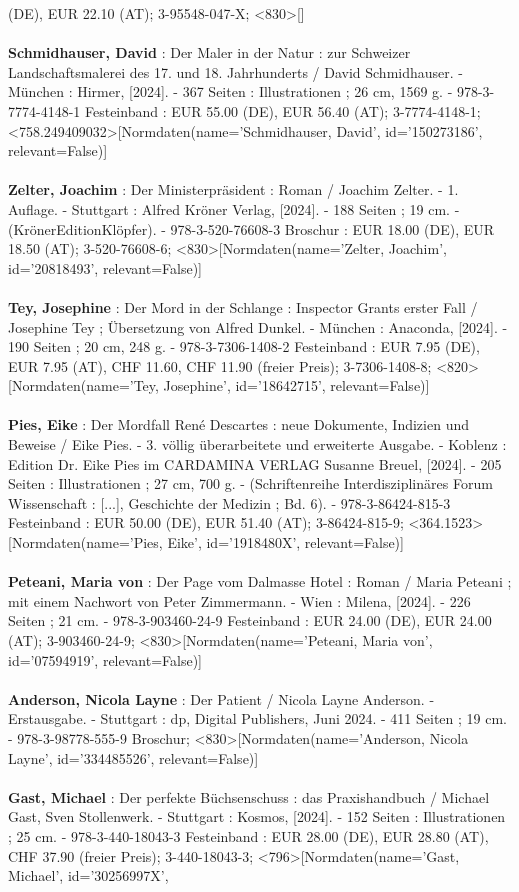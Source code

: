 \documentclass{article}
\begin{document}
\begin{multicols}{3}
(DE), EUR 22.10 (AT); 3-95548-047-X; <830>[]\\\\\textbf{Schmidhauser, David} : Der Maler in der Natur : zur Schweizer Landschaftsmalerei des 17. und 18. Jahrhunderts / David Schmidhauser. - München : Hirmer, [2024]. - 367 Seiten : Illustrationen ; 26 cm, 1569 g. - 978-3-7774-4148-1 Festeinband : EUR 55.00 (DE), EUR 56.40 (AT); 3-7774-4148-1; <758.249409032>[Normdaten(name='Schmidhauser, David', id='150273186', relevant=False)]\\\\\textbf{Zelter, Joachim} : Der Ministerpräsident : Roman / Joachim Zelter. - 1. Auflage. - Stuttgart : Alfred Kröner Verlag, [2024]. - 188 Seiten ; 19 cm. - (KrönerEditionKlöpfer). - 978-3-520-76608-3 Broschur : EUR 18.00 (DE), EUR 18.50 (AT); 3-520-76608-6; <830>[Normdaten(name='Zelter, Joachim', id='20818493', relevant=False)]\\\\\textbf{Tey, Josephine} : Der Mord in der Schlange : Inspector Grants erster Fall / Josephine Tey ; Übersetzung von Alfred Dunkel. - München : Anaconda, [2024]. - 190 Seiten ; 20 cm, 248 g. - 978-3-7306-1408-2 Festeinband : EUR 7.95 (DE), EUR 7.95 (AT), CHF 11.60, CHF 11.90 (freier Preis); 3-7306-1408-8; <820>[Normdaten(name='Tey, Josephine', id='18642715', relevant=False)]\\\\\textbf{Pies, Eike} : Der Mordfall René Descartes : neue Dokumente, Indizien und Beweise / Eike Pies. - 3. völlig überarbeitete und erweiterte Ausgabe. - Koblenz : Edition Dr. Eike Pies im CARDAMINA VERLAG Susanne Breuel, [2024]. - 205 Seiten : Illustrationen ; 27 cm, 700 g. - (Schriftenreihe Interdisziplinäres Forum Wissenschaft : [...], Geschichte der Medizin ; Bd. 6). - 978-3-86424-815-3 Festeinband : EUR 50.00 (DE), EUR 51.40 (AT); 3-86424-815-9; <364.1523>[Normdaten(name='Pies, Eike', id='1918480X', relevant=False)]\\\\\textbf{Peteani, Maria von} : Der Page vom Dalmasse Hotel : Roman / Maria Peteani ; mit einem Nachwort von Peter Zimmermann. - Wien : Milena, [2024]. - 226 Seiten ; 21 cm. - 978-3-903460-24-9 Festeinband : EUR 24.00 (DE), EUR 24.00 (AT); 3-903460-24-9; <830>[Normdaten(name='Peteani, Maria von', id='07594919', relevant=False)]\\\\\textbf{Anderson, Nicola Layne} : Der Patient / Nicola Layne Anderson. - Erstausgabe. - Stuttgart : dp, Digital Publishers, Juni 2024. - 411 Seiten ; 19 cm. - 978-3-98778-555-9 Broschur; <830>[Normdaten(name='Anderson, Nicola Layne', id='334485526', relevant=False)]\\\\\textbf{Gast, Michael} : Der perfekte Büchsenschuss : das Praxishandbuch / Michael Gast, Sven Stollenwerk. - Stuttgart : Kosmos, [2024]. - 152 Seiten : Illustrationen ; 25 cm. - 978-3-440-18043-3 Festeinband : EUR 28.00 (DE), EUR 28.80 (AT), CHF 37.90 (freier Preis); 3-440-18043-3; <796>[Normdaten(name='Gast, Michael', id='30256997X', 
\end{multicols}
\end{document}
